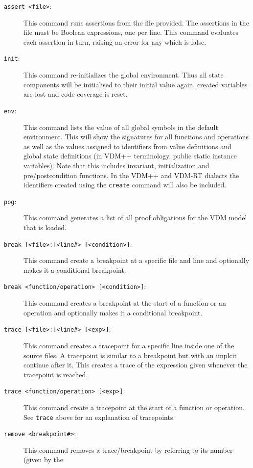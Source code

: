 \documentclass{overturerepchap}
\begin{document}
\begin{description}
\item[\texttt{assert <file>}:] This command runs assertions from the
  file provided. The assertions in the file must be Boolean
  expressions, one per line. This command evaluates each assertion in
  turn, raising an error for any which is false.  
\item[\texttt{init}:] This command re-initializes the global
  environment. Thus all state components will be initialised to their
  initial value again, created variables are lost and code coverage
  is reset. 
\item[\texttt{env}:] This command lists the value of all global symbols
  in the default environment. This will show the signatures for all
  functions and operations as well as the values assigned to
  identifiers from value definitions and global state definitions (in VDM++
  terminology, public static instance variables). Note that this includes invariant,
  initialization and pre/postcondition functions. In the VDM++ and
  VDM-RT dialects the identifiers created using the \texttt{create}
  command will also be included. 
\item[\texttt{pog}:] This command generates a list of all proof
  obligations for the VDM model that is
  loaded.  
\item[\texttt{break [<file>:]<line\#> [<condition>]}:] This command
  create a breakpoint at a specific file and line and optionally makes
  it a conditional breakpoint.  
\item[\texttt{break <function/operation> [<condition>]}:] This command
  creates a breakpoint at the start of a function or an operation and
  optionally makes it a conditional breakpoint. 
\item[\texttt{trace [<file>:]<line\#> [<exp>]}:] This command creates a
  tracepoint for a specific line inside one of the source files. A
  tracepoint is similar to a breakpoint but with an implcit continue
  after it. This creates a trace of the expression given
  whenever the tracepoint is reached.  
\item[\texttt{trace <function/operation> [<exp>]}:] This command
  create a tracepoint at the start of a function or operation.
  See \texttt{trace} above for an explanation of tracepoints.
\item[\texttt{remove <breakpoint\#>}:] This command removes a
  trace/breakpoint by referring to its number (given by the

\end{description}
\end{document}
